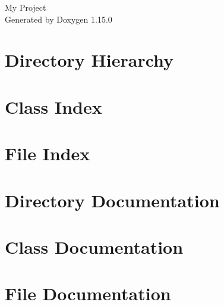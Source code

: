 \documentclass[twoside]{book}
\newcommand{\+}{\discretionary{\mbox{\scriptsize$\hookleftarrow$}}{}{}}
\newcommand{\clearemptydoublepage}{%
    \newpage{\pagestyle{empty}\cleardoublepage}%
  }
\begin{document}
  \raggedbottom
    \hypersetup{pageanchor=false,
                bookmarksnumbered=true,
                pdfencoding=unicode
               }
  \begin{titlepage}
  \vspace*{7cm}
  \begin{center}%
  {\Large My Project}\\
  \vspace*{1cm}
  {\large Generated by Doxygen 1.15.0}\\
  \end{center}
  \end{titlepage}
  \clearemptydoublepage
  \tableofcontents
  \clearemptydoublepage
  \hypersetup{pageanchor=true}
\chapter{Directory Hierarchy}

\chapter{Class Index}

\chapter{File Index}

\chapter{Directory Documentation}

\chapter{Class Documentation}

\chapter{File Documentation}

  \backmatter
  \newpage
  \clearemptydoublepage
  \printindex
\end{document}
